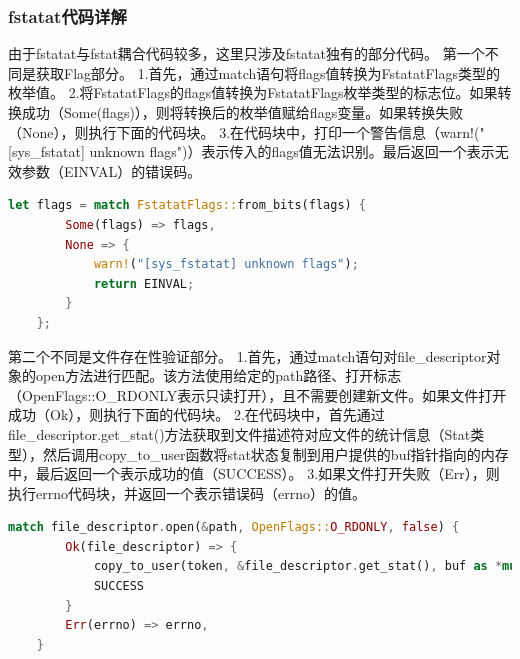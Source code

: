 \subsubsection{fstatat代码详解}
由于fstatat与fstat耦合代码较多，这里只涉及fstatat独有的部分代码。
第一个不同是获取Flag部分。
1.首先，通过match语句将flags值转换为FstatatFlags类型的枚举值。
2.将FstatatFlags的flags值转换为FstatatFlags枚举类型的标志位。如果转换成功（Some(flags)），则将转换后的枚举值赋给flags变量。如果转换失败（None），则执行下面的代码块。
3.在代码块中，打印一个警告信息（warn!("[sys_fstatat] unknown flags")）表示传入的flags值无法识别。最后返回一个表示无效参数（EINVAL）的错误码。
\begin{lstlisting}[language={Rust}, label={code:new_area},
	caption={FstatatFlag判断}]
    let flags = match FstatatFlags::from_bits(flags) {
        Some(flags) => flags,
        None => {
            warn!("[sys_fstatat] unknown flags");
            return EINVAL;
        }
    };
\end{lstlisting}
第二个不同是文件存在性验证部分。
1.首先，通过match语句对file_descriptor对象的open方法进行匹配。该方法使用给定的path路径、打开标志（OpenFlags::O_RDONLY表示只读打开），且不需要创建新文件。如果文件打开成功（Ok），则执行下面的代码块。
2.在代码块中，首先通过file_descriptor.get_stat()方法获取到文件描述符对应文件的统计信息（Stat类型），然后调用copy_to_user函数将stat状态复制到用户提供的buf指针指向的内存中，最后返回一个表示成功的值（SUCCESS）。
3.如果文件打开失败（Err），则执行errno代码块，并返回一个表示错误码（errno）的值。
\begin{lstlisting}[language={Rust}, label={code:new_area},
	caption={存在性验证与stat拷贝}]
    match file_descriptor.open(&path, OpenFlags::O_RDONLY, false) {
        Ok(file_descriptor) => {
            copy_to_user(token, &file_descriptor.get_stat(), buf as *mut Stat);
            SUCCESS
        }
        Err(errno) => errno,
    }
\end{lstlisting}